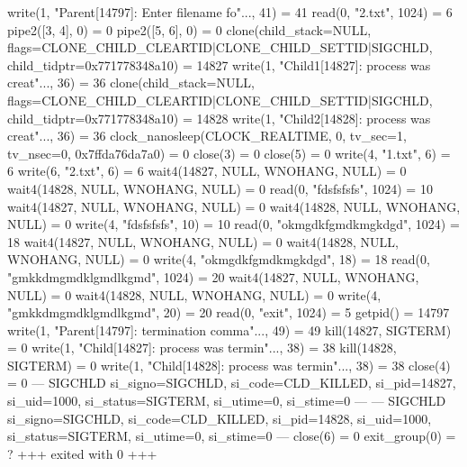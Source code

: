 \begin{breakableverbatim}
write(1, "Parent[14797]: Enter filename fo"..., 41) = 41
read(0, "2.txt\n", 1024)                = 6
pipe2([3, 4], 0)                        = 0
pipe2([5, 6], 0)                        = 0
clone(child_stack=NULL, flags=CLONE_CHILD_CLEARTID|CLONE_CHILD_SETTID|SIGCHLD, child_tidptr=0x771778348a10) = 14827
write(1, "Child1[14827]: process was creat"..., 36) = 36
clone(child_stack=NULL, flags=CLONE_CHILD_CLEARTID|CLONE_CHILD_SETTID|SIGCHLD, child_tidptr=0x771778348a10) = 14828
write(1, "Child2[14828]: process was creat"..., 36) = 36
clock_nanosleep(CLOCK_REALTIME, 0, {tv_sec=1, tv_nsec=0}, 0x7ffda76da7a0) = 0
close(3)                                = 0
close(5)                                = 0
write(4, "1.txt\n", 6)                  = 6
write(6, "2.txt\n", 6)                  = 6
wait4(14827, NULL, WNOHANG, NULL)       = 0
wait4(14828, NULL, WNOHANG, NULL)       = 0
read(0, "fdsfsfsfs\n", 1024)            = 10
wait4(14827, NULL, WNOHANG, NULL)       = 0
wait4(14828, NULL, WNOHANG, NULL)       = 0
write(4, "fdsfsfsfs\n", 10)             = 10
read(0, "okmgdkfgmdkmgkdgd\n", 1024)    = 18
wait4(14827, NULL, WNOHANG, NULL)       = 0
wait4(14828, NULL, WNOHANG, NULL)       = 0
write(4, "okmgdkfgmdkmgkdgd\n", 18)     = 18
read(0, "gmkkdmgmdklgmdlkgmd\n", 1024)  = 20
wait4(14827, NULL, WNOHANG, NULL)       = 0
wait4(14828, NULL, WNOHANG, NULL)       = 0
write(4, "gmkkdmgmdklgmdlkgmd\n", 20)   = 20
read(0, "exit\n", 1024)                 = 5
getpid()                                = 14797
write(1, "Parent[14797]: termination comma"..., 49) = 49
kill(14827, SIGTERM)                    = 0
write(1, "Child[14827]: process was termin"..., 38) = 38
kill(14828, SIGTERM)                    = 0
write(1, "Child[14828]: process was termin"..., 38) = 38
close(4)                                = 0
--- SIGCHLD {si_signo=SIGCHLD, si_code=CLD_KILLED, si_pid=14827, si_uid=1000, si_status=SIGTERM, si_utime=0, si_stime=0} ---
--- SIGCHLD {si_signo=SIGCHLD, si_code=CLD_KILLED, si_pid=14828, si_uid=1000, si_status=SIGTERM, si_utime=0, si_stime=0} ---
close(6)                                = 0
exit_group(0)                           = ?
+++ exited with 0 +++
\end{breakableverbatim}
